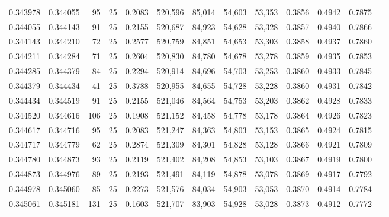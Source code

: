 \begin{tabular}{rrrrrrrrrrrrr}
0.343978 & 0.344055 &    95 &  25 &                                     0.2083 & 520,596 &  85,014 &  54,603 &  53,353 & 0.3856 & 0.4942 & 0.7875 \\
0.344055 & 0.344143 &    91 &  25 &                                     0.2155 & 520,687 &  84,923 &  54,628 &  53,328 & 0.3857 & 0.4940 & 0.7866 \\
0.344143 & 0.344210 &    72 &  25 &                                     0.2577 & 520,759 &  84,851 &  54,653 &  53,303 & 0.3858 & 0.4937 & 0.7860 \\
0.344211 & 0.344284 &    71 &  25 &                                     0.2604 & 520,830 &  84,780 &  54,678 &  53,278 & 0.3859 & 0.4935 & 0.7853 \\
0.344285 & 0.344379 &    84 &  25 &                                     0.2294 & 520,914 &  84,696 &  54,703 &  53,253 & 0.3860 & 0.4933 & 0.7845 \\
0.344379 & 0.344434 &    41 &  25 &                                     0.3788 & 520,955 &  84,655 &  54,728 &  53,228 & 0.3860 & 0.4931 & 0.7842 \\
0.344434 & 0.344519 &    91 &  25 &                                     0.2155 & 521,046 &  84,564 &  54,753 &  53,203 & 0.3862 & 0.4928 & 0.7833 \\
0.344520 & 0.344616 &   106 &  25 &                                     0.1908 & 521,152 &  84,458 &  54,778 &  53,178 & 0.3864 & 0.4926 & 0.7823 \\
0.344617 & 0.344716 &    95 &  25 &                                     0.2083 & 521,247 &  84,363 &  54,803 &  53,153 & 0.3865 & 0.4924 & 0.7815 \\
0.344717 & 0.344779 &    62 &  25 &                                     0.2874 & 521,309 &  84,301 &  54,828 &  53,128 & 0.3866 & 0.4921 & 0.7809 \\
0.344780 & 0.344873 &    93 &  25 &                                     0.2119 & 521,402 &  84,208 &  54,853 &  53,103 & 0.3867 & 0.4919 & 0.7800 \\
0.344873 & 0.344976 &    89 &  25 &                                     0.2193 & 521,491 &  84,119 &  54,878 &  53,078 & 0.3869 & 0.4917 & 0.7792 \\
0.344978 & 0.345060 &    85 &  25 &                                     0.2273 & 521,576 &  84,034 &  54,903 &  53,053 & 0.3870 & 0.4914 & 0.7784 \\
0.345061 & 0.345181 &   131 &  25 &                                     0.1603 & 521,707 &  83,903 &  54,928 &  53,028 & 0.3873 & 0.4912 & 0.7772 \\

\end{tabular}
